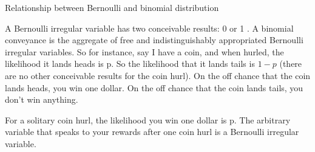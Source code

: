 \documentclass[11pt]{article}
\begin{document}
 Relationship between Bernoulli and binomial distribution
 
 A Bernoulli irregular variable has two conceivable results: 0 or 1 . A binomial conveyance is the aggregate of free and indistinguishably appropriated Bernoulli irregular variables. So for instance, say I have a coin, and when hurled, the likelihood it lands heads is p. So the likelihood that it lands tails is $1−p$ (there are no other conceivable results for the coin hurl). On the off chance that the coin lands heads, you win one dollar. On the off chance that the coin lands tails, you don't win anything. 

For a solitary coin hurl, the likelihood you win one dollar is p. The arbitrary variable that speaks to your rewards after one coin hurl is a Bernoulli irregular variable.
\end{document}
